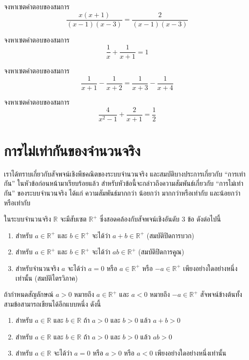 \begin{examplebox}
	จงหาเซตคำตอบของสมการ 
	$$\dfrac{x(x+1)}{(x-1)(x-3)} = \dfrac{2}{(x-1)(x-3)}$$
\end{examplebox}   
\solution
\newpage

\begin{examplebox}
	จงหาเซตคำตอบของสมการ 
	$$\dfrac{1}{x} + \dfrac{1}{x+1} = 1$$
\end{examplebox}  
\solution
\newpage

\begin{examplebox}
	จงหาเซตคำตอบของสมการ 
	$$\dfrac{1}{x+1} - \dfrac{1}{x+2} = \dfrac{1}{x+3} - \dfrac{1}{x+4}$$
\end{examplebox}     
\solution
\newpage

\begin{examplebox}
	จงหาเซตคำตอบของสมการ 
	$$\dfrac{4}{x^2-1} + \dfrac{2}{x+1} = \dfrac{1}{2}$$
\end{examplebox}     
\solution
\newpage


\section{การไม่เท่ากันของจำนวนจริง}

เราได้ทราบเกี่ยวกับสัจพจน์เชิงพีชคณิตของระบบจำนวนจริง และสมบัติบางประการเกี่ยวกับ ``การเท่ากัน'' ในหัวข้อก่อนหน้ามาเรียบร้อยแล้ว สำหรับหัวข้อนี้จะกล่าวถึงความสัมพันธ์เกี่ยวกับ ``การไม่เท่ากัน'' ของระบบจำนวนจริง ได้แก่ ความสัมพันธ์มากกว่า น้อยกว่า มากกว่าหรือเท่ากับ และน้อยกว่าหรือเท่ากับ

\begin{remarkbox}
	ในระบบจำนวนจริง $\mathbb{R}$ จะมีสับเซต $\mathbb{R}^{+}$ ซึ่งสอดคล้องกับสัจพจน์เชิงอันดับ $3$ ข้อ ดังต่อไปนี้
	\begin{enumerate}[label=\arabic*., leftmargin=2em, itemsep=0.5em]
		\item สำหรับ $a \in \mathbb{R}^{+}$ และ $b \in \mathbb{R}^{+}$ จะได้ว่า $a+b \in \mathbb{R}^{+}$ (สมบัติปิดการบวก)
		\item สำหรับ $a \in \mathbb{R}^{+}$ และ $b \in \mathbb{R}^{+}$ จะได้ว่า $ab \in \mathbb{R}^{+}$ (สมบัติปิดการคูณ)
		\item สำหรับจำนวนจริง $a$ จะได้ว่า $a = 0$ หรือ $a \in \mathbb{R}^{+}$ หรือ $-a \in \mathbb{R}^{+}$ เพียงอย่างใดอย่างหนึ่งเท่านั้น (สมบัติไตรวิภาค)
	\end{enumerate}
\end{remarkbox}

\vspace{0.5em}
ถ้ากำหนดสัญลักษณ์ $a > 0$ หมายถึง $a \in \mathbb{R}^{+}$ และ $a < 0$ หมายถึง $-a \in \mathbb{R}^{+}$ สัจพจน์ข้างต้นทั้งสามข้อสามารถเขียนได้อีกแบบหนึ่ง ดังนี้
\begin{enumerate}[label=\arabic*., leftmargin=2em, itemsep=0.5em]
	\item สำหรับ $a \in \mathbb{R}$ และ $b \in \mathbb{R}$ ถ้า $a > 0$ และ $b > 0$ แล้ว $a+b > 0$
	\item สำหรับ $a \in \mathbb{R}$ และ $b \in \mathbb{R}$ ถ้า $a > 0$ และ $b > 0$ แล้ว $ab > 0$
	\item สำหรับ $a \in \mathbb{R}$ จะได้ว่า $a = 0$ หรือ $a > 0$ หรือ $a < 0$ เพียงอย่างใดอย่างหนึ่งเท่านั้น
\end{enumerate}

